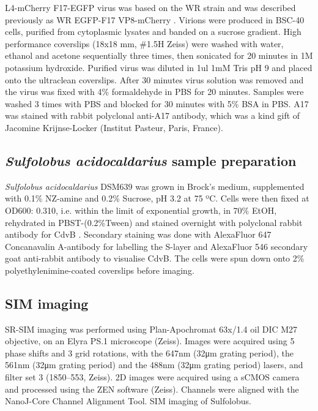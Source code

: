 L4-mCherry F17-EGFP virus was based on the WR strain and was described previously as WR EGFP-F17 VP8-mCherry \cite{schmidt2013vaccinia}. Virions were produced in BSC-40 cells, purified from cytoplasmic lysates and banded on a sucrose gradient. High performance coverslips (18x18 mm, \#1.5H Zeiss) were washed with water, ethanol and acetone sequentially three times, then sonicated for 20 minutes in 1M potassium hydroxide. Purified virus was diluted in 1ul 1mM Tris pH 9 and placed onto the ultraclean coverslips. After 30 minutes virus solution was removed and the virus was fixed with 4\% formaldehyde in PBS for 20 minutes. Samples were washed 3 times with PBS and blocked for 30 minutes with 5\% BSA in PBS. A17 was stained with rabbit polyclonal anti-A17 antibody, which was a kind gift of Jacomine Krijnse-Locker (Institut Pasteur, Paris, France).

\subsection{\textit{Sulfolobus acidocaldarius} sample preparation}

\textit{Sulfolobus acidocaldarius} DSM639 was grown in Brock’s medium, supplemented with 0.1\% NZ-amine and 0.2\% Sucrose, pH 3.2 at 75 ºC. Cells were then fixed at OD600: 0.310, i.e. within the limit of exponential growth, in 70\% EtOH, rehydrated in PBST-(0.2\%Tween) and stained overnight with polyclonal rabbit antibody for CdvB \cite{Lindås et al, 2008}. Secondary staining was done with AlexaFluor 647 Concanavalin A-antibody for labelling the S-layer and AlexaFluor 546 secondary goat anti-rabbit antibody to visualise CdvB. The cells were spun down onto 2\% polyethylenimine-coated coverslips before imaging.
 
\subsection{SIM imaging}
 
SR-SIM imaging was performed using Plan-Apochromat 63x/1.4 oil DIC M27 objective, on an Elyra PS.1 microscope (Zeiss). Images were acquired using 5 phase shifts and 3 grid rotations, with the 647nm (32μm grating period), the 561nm (32μm grating period) and the 488nm (32μm grating period) lasers, and filter set 3 (1850–553, Zeiss). 2D images were acquired using a sCMOS camera and processed using the ZEN software (Zeiss). Channels were aligned with the NanoJ-Core Channel Alignment Tool. SIM imaging of Sulfolobus.




